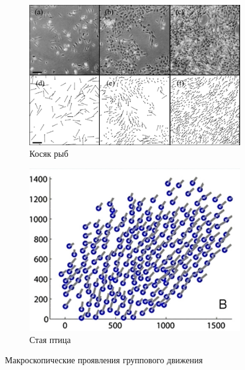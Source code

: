    \begin{figure}
    	\centering
        \begin{subfigure}[b]{0.4\textwidth}
        \centering
                \includegraphics[width=\textwidth]{Images/Fig17_CollectiveMotion}
                \caption{Косяк рыб~\cite[с. 90]{vicsek2012}}
                \label{fig:CollMot:fishes}
        \end{subfigure}
        \begin{subfigure}[b]{0.4\textwidth}
        \centering
                \includegraphics[width=\textwidth]{Images/Fig29_CollectiveMotion_part}
                \caption{Стая птица~\cite{lukeman2010}}
                \label{fig:CollMot:ducks}
        \end{subfigure}
        \caption{Макроскопические проявления группового движения}\label{fig:CollMot:macroscopic}
	\end{figure}

